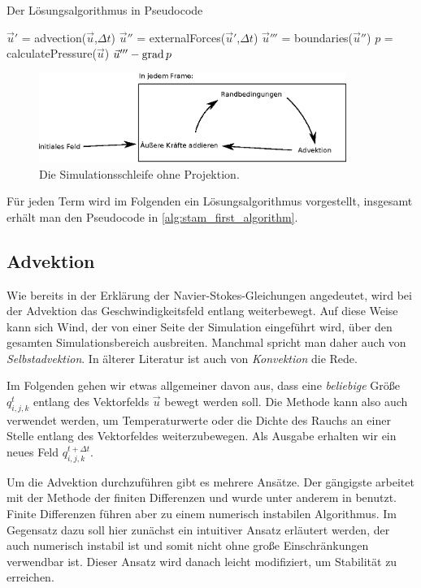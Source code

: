 \begin{algorithm}
\caption{Der Lösungsalgorithmus in Pseudocode}
\label{alg:stam_first_algorithm}
\begin{algorithmic}
	\State $\vec{u}'$ = advection($\vec{u}$,$\Delta t$)
	\State $\vec{u}''$ = externalForces($\vec{u}'$,$\Delta t$)
	\State $\vec{u}'''$ = boundaries($\vec{u}''$)
	\State $p$ = calculatePressure($\vec{u}$)
	\State \Return $\vec{u}''' - \operatorname*{grad} p$
\EndFunction
\end{algorithmic}
\end{algorithm}

\begin{figure}[ht]
\includegraphics[width=10cm]{images/stam_loop}
\caption{Die Simulationsschleife ohne Projektion.}
\end{figure}

Für jeden Term wird im Folgenden ein Lösungsalgorithmus vorgestellt, insgesamt
erhält man den Pseudocode in \autoref{alg:stam_first_algorithm}.

\subsection{Advektion}

Wie bereits in der Erklärung der Navier-Stokes-Gleichungen angedeutet, wird bei
der Advektion das Geschwindigkeitsfeld entlang 
weiterbewegt. Auf diese Weise kann sich Wind, der von einer Seite der
Simulation eingeführt wird, über den gesamten Simulationsbereich ausbreiten.
Manchmal spricht man daher auch von \emph{Selbstadvektion}. In älterer Literatur
ist auch von \emph{Konvektion} die Rede.

Im Folgenden gehen wir etwas allgemeiner davon aus, dass eine \emph{beliebige} Größe
$q_{i,j,k}^t$ entlang des Vektorfelds $\vec{u}$ bewegt werden soll. Die Methode
 kann also auch verwendet werden, um
Temperaturwerte oder die Dichte des Rauchs an einer Stelle entlang des
Vektorfeldes weiterzubewegen. Als Ausgabe erhalten wir ein neues Feld
$q_{i,j,k}^{t+\Delta t}$.

Um die Advektion durchzuführen gibt es mehrere Ansätze. Der gängigste arbeitet
mit der Methode der finiten Differenzen und wurde unter anderem in
\cite{Foster} benutzt. Finite Differenzen führen aber zu einem numerisch
instabilen Algorithmus. Im Gegensatz dazu soll hier zunächst ein intuitiver
Ansatz erläutert werden, der auch numerisch instabil ist und somit nicht ohne
große Einschränkungen verwendbar ist. Dieser Ansatz wird danach leicht
modifiziert, um Stabilität zu erreichen.

